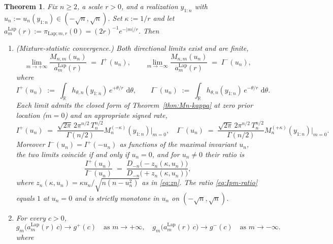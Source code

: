 \documentclass[numsec,webpdf,modern,medium,namedate]{oup-authoring-template}
\theoremstyle{thmstyleone}%
\newtheorem{theorem}{Theorem}%
\theoremstyle{thmstyletwo}%
\theoremstyle{thmstylethree}%
\newcommand{\dd}{\,\mathrm{d}}
\newcommand{\Lap}{\mathrm{Lap}}
\newcommand{\1}{\mathbf{1}}
\begin{document}
\begin{theorem}\label{thm:laplace-limits}
Fix $n\geq 2$, a scale $r>0$, and a realization $y_{1:n}$ with
$u_n := u_n(y_{1:n})\in(-\sqrt n,\sqrt n)$. Set $\kappa := 1/r$ and let
$a_m^{\Lap}(r) := \pi_{\Lap;m,r}(0) = (2r)^{-1}e^{-|m|/r}$.
Then 
\begin{enumerate}
    \item[(a)] (Mixture-statistic convergence.) Both directional limits exist and are finite,
\begin{equation}\label{eq:Lap-limits}
  \lim_{m\to+\infty}\frac{M_{n,m}(u_n)}{a_m^{\Lap}(r)}
  \;=\;I^+(u_n),
  \qquad
  \lim_{m\to-\infty}\frac{M_{n,m}(u_n)}{a_m^{\Lap}(r)}
  \;=\;I^-(u_n),
\end{equation}
where
\begin{equation}\label{eq:Ipm-def}
  I^+(u_n) \;:=\;\int_\mathbb{R} h_{\theta,n}(y_{1:n})\,e^{+\theta/r}\,\dd\theta,
  \qquad
  I^-(u_n) \;:=\;\int_\mathbb{R} h_{\theta,n}(y_{1:n})\,e^{-\theta/r}\,\dd\theta.
\end{equation}
Each limit admits the closed form of Theorem~\ref{thm:Mn-kappa} at
zero prior location ($m=0$) and an appropriate signed rate,
\begin{equation}\label{eq:Ipm-closed}
  I^+(u_n) \;=\; \frac{\sqrt{2\pi} \, 2\pi^{n/2} \, T_n^{n/2} }{\Gamma(n/2)} M_n^{(-\kappa)}(y_{1:n})\big|_{m=0},
  \quad
  I^-(u_n) \;=\; \frac{\sqrt{2\pi} \, 2\pi^{n/2} \, T_n^{n/2} }{\Gamma(n/2)} M_n^{(+\kappa)}(y_{1:n})\big|_{m=0}.
\end{equation}
Moreover $I^-(u_n) = I^+(-u_n)$ as functions of the maximal invariant
$u_n$, the two limits coincide if and only if $u_n=0$, and for
$u_n\neq 0$ their ratio is
\begin{equation}\label{eq:Ipm-ratio}
  \frac{I^+(u_n)}{I^-(u_n)}
  \;=\;\frac{D_{-n}\!\bigl(-z_n(\kappa,u_n)\bigr)}
            {D_{-n}\!\bigl(+z_n(\kappa,u_n)\bigr)},
\end{equation}
where $z_n(\kappa,u_n) = \kappa u_n/\sqrt{n(n-u_n^2)}$ as in
\eqref{eq:zn}. The ratio \eqref{eq:Ipm-ratio} equals $1$ at $u_n=0$ and
is strictly monotone in $u_n$ on $(-\sqrt n,\sqrt n)$.
    \item[(b)] For every $c>0$,
\begin{equation}\label{eq:gm-conv}
  g_m\!\bigl(a_m^{\Lap}(r)\,c\bigr) \longrightarrow g^+(c)
  \quad\text{as }m\to+\infty,
  \quad
  g_m\!\bigl(a_m^{\Lap}(r)\,c\bigr) \longrightarrow g^-(c)
  \quad\text{as }m\to-\infty.
\end{equation}
where 
\begin{equation}\label{eq:gm-Lap}

\end{equation}
\end{enumerate}
\end{theorem}
\end{document}
